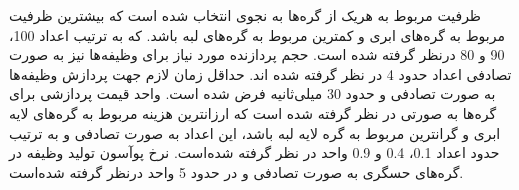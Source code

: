 ظرفیت مربوط به هریک از گره‌ها به نجوی انتخاب شده است که بیشترین ظرفیت مربوط به گره‌های ابری و کمترین مربوط به گره‌های لبه باشد. که به ترتیب اعداد 100، 90 و 80 درنظر گرفته شده است. حجم پردازنده مورد نیاز برای وظیفه‌ها نیز به صورت تصادفی اعداد حدود 4 در نظر گرفته شده اند. حداقل زمان لازم جهت پردازش وظیفه‌ها به صورت تصادفی و حدود 30 میلی‌ثانیه فرض شده است. واحد قیمت پردازشی برای گره‌ها به صورتی در نظر گرفته شده است که ارزانترین هزینه مربوط به گره‌های لایه ابری و گرانترین مربوط به گره‌ لایه لبه باشد، این اعداد به صورت تصادفی و به ترتیب حدود اعداد 0.1، 0.4 و 0.9 واحد در نظر گرفته شده‌است. نرخ پوآسون تولید وظیفه در گره‌های حسگری به صورت تصادفی و در حدود 5 واحد درنظر گرفته شده‌است. 



